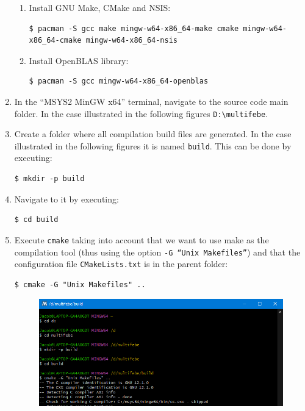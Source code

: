 \documentclass[a4paper,fleqn]{book}
\begin{document}
\begin{enumerate}
\begin{enumerate}
    \item Install GNU Make, CMake and NSIS:
\begin{Verbatim}[frame=single, fontsize=\footnotesize]
$ pacman -S gcc make mingw-w64-x86_64-make cmake mingw-w64-x86_64-cmake mingw-w64-x86_64-nsis
\end{Verbatim}
    \item Install OpenBLAS library:
\begin{Verbatim}[frame=single, fontsize=\small]
$ pacman -S gcc mingw-w64-x86_64-openblas
\end{Verbatim}
\end{enumerate}
  \item In the ``MSYS2  MinGW x64'' terminal, navigate to the source code main folder. In the case illustrated in the following figures \texttt{D:\textbackslash multifebe}.
  \item Create a folder where all compilation build files are generated. In the case illustrated in the following figures it is named \texttt{build}. This can be done by executing:
\begin{Verbatim}[frame=single, fontsize=\small]
$ mkdir -p build
\end{Verbatim}
  \item Navigate to it by executing:
\begin{Verbatim}[frame=single, fontsize=\small]
$ cd build
\end{Verbatim}
  \item Execute \texttt{cmake} taking into account that we want to use make as the compilation tool (thus using the option \texttt{-G ``Unix Makefiles''}) and that the configuration file \texttt{CMakeLists.txt} is in the parent folder:
\begin{Verbatim}[frame=single, fontsize=\small]
$ cmake -G "Unix Makefiles" ..
\end{Verbatim}
  \begin{figure}[h]
  \centering
  \includegraphics[scale=0.7]{figures/windows_compilation_013.png}

\end{figure}
\end{enumerate}
\end{document}
